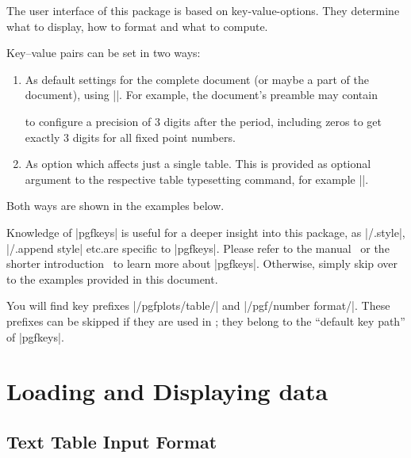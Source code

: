 \documentclass[a4paper]{ltxdoc}
\begin{document}
\begin{command}{\pgfplotstableset{}}
    The user interface of this package is based on key-value-options. They
    determine what to display, how to format and what to compute.

    Key--value pairs can be set in two ways:
    \begin{enumerate}
        \item As default settings for the complete document (or maybe a part
            of the document), using |\pgfplotstableset|. For
            example, the document's preamble may contain
\begin{codeexample}
\end{codeexample}
            to configure a precision of $3$ digits after the period, including
            zeros to get exactly $3$ digits for all fixed point numbers.
        \item As option which affects just a single table. This is provided
            as optional argument to the respective table typesetting command,
            for example |\pgfplotstabletypeset|.
    \end{enumerate}
    Both ways are shown in the examples below.

    Knowledge of |pgfkeys| is useful for a deeper insight into this package, as
    |/.style|, |/.append style| etc.\@ are specific to |pgfkeys|. Please refer
    to the \PGF{} manual~\cite[Section ``pgfkeys'']{tikz} or the shorter
    introduction~\cite{keyvalintro} to learn more about |pgfkeys|. Otherwise,
    simply skip over to the examples provided in this document.

    You will find key prefixes |/pgfplots/table/| and |/pgf/number format/|.
    These prefixes can be skipped if they are used in \PGFPlotstable{}; they
    belong to the ``default key path'' of |pgfkeys|.
\end{command}


\section{Loading and Displaying data}

\subsection{Text Table Input Format}
\end{document}
